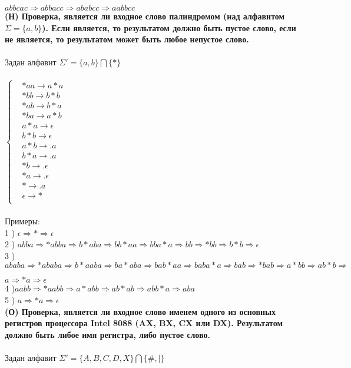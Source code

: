 \documentclass[a4paper,25pt]{book}
\begin{document}
$abbcac\Rightarrow abbacc\Rightarrow ababcc\Rightarrow aabbcc$\\

\textbf{(Н) Проверка, является ли входное слово палиндромом  (над алфавитом
$\Sigma = \{a, b \}$). Если является, то результатом должно быть пустое слово, если не является, то результатом может быть любое непустое слово.}\\\\
Задан алфавит $\Sigma' = \{a, b \} \bigcap \{*\}$\\\\
$ \left\{
\begin{aligned}
& *aa \rightarrow a*a \\
& *bb \rightarrow b*b \\
& *ab \rightarrow b*a \\
& *ba \rightarrow a*b \\
& a*a \rightarrow \epsilon \\
& b*b \rightarrow \epsilon \\
& a*b \rightarrow .a \\
& b*a \rightarrow .a \\
& *b \rightarrow .\epsilon \\
& *a \rightarrow .\epsilon \\
& * \rightarrow .a \\
& \epsilon \rightarrow * \\
\end{aligned}
\right.$
\\\\
Примеры:\\
1 ) $\epsilon \Rightarrow *\Rightarrow \epsilon$\\
2 ) $abba \Rightarrow *abba\Rightarrow b*aba\Rightarrow bb*aa\Rightarrow bba*a\Rightarrow bb\Rightarrow *bb\Rightarrow b*b\Rightarrow\epsilon$\\
3 ) $ababa\Rightarrow *ababa\Rightarrow b*aaba\Rightarrow ba*aba\Rightarrow bab*aa\Rightarrow baba*a\Rightarrow bab\Rightarrow *bab\Rightarrow a*bb\Rightarrow ab*b\Rightarrow$

$ a\Rightarrow *a\Rightarrow \epsilon$\\
4 )$aabb\Rightarrow *aabb\Rightarrow a*abb\Rightarrow ab*ab\Rightarrow abb*a\Rightarrow aba$ \\
5 ) $a\Rightarrow *a\Rightarrow \epsilon$\\

\textbf{(О) Проверка, является ли входное слово именем одного из основных регистров процессора Intel 8088 (AX, BX, CX или DX). Результатом должно быть либое имя регистра, либо пустое слово.}\\\\
Задан алфавит $\Sigma' = \{A,B,C,D,X \} \bigcap \{\#,|\}$\\
\end{document}
